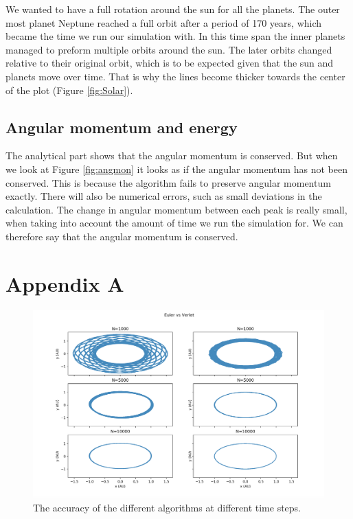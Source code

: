 \documentclass{article}
\begin{document}
\begin{multicols}{2}
We wanted to have a full rotation around the sun for all the planets. The outer most planet Neptune reached a full orbit after a period of 170 years, which became the time we run our simulation with. In this time span the inner planets managed to preform multiple orbits around the sun. The later orbits changed relative to their original orbit, which is to be expected given that the sun and planets move over time. That is why the lines become thicker towards the center of the plot (Figure \ref{fig:Solar}). 

\subsection{Angular momentum and energy}

The analytical part shows that the angular momentum is conserved. But when we look at Figure \ref{fig:angmon} it looks as if the angular momentum has not been conserved. This is because the algorithm fails to preserve angular momentum exactly. There will also be numerical errors, such as small deviations in the calculation. The change in angular momentum between each peak is really small, when taking into account the amount of time we run the simulation for. We can therefore say that the angular momentum is conserved. 

\end{multicols}

\clearpage

\appendix \section*{Appendix A} %

\begin{figure}[H]
	\centering
	\includegraphics[width=120mm]{Acc}
	\caption{The accuracy of the different algorithms at different time steps.}
	\label{fig:Acc}
\end{figure}
\end{document}
